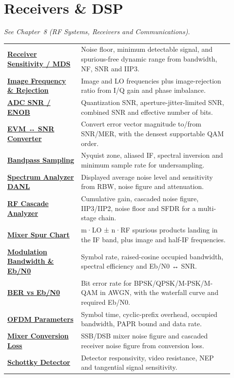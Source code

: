 \section*{Receivers \& DSP}
\noindent\emph{See Chapter~8 (RF Systems, Receivers and Communications).}
\begin{longtable}{>{\raggedright\arraybackslash}p{0.30\linewidth}>{\raggedright\arraybackslash}p{0.62\linewidth}}
\hline
\href{https://rftoolbox.ca/Sensitivity.html}{\textbf{Receiver Sensitivity / MDS}} & Noise floor, minimum detectable signal, and spurious-free dynamic range from bandwidth, NF, SNR and IIP3. \\
\href{https://rftoolbox.ca/ImageReject.html}{\textbf{Image Frequency \& Rejection}} & Image and LO frequencies plus image-rejection ratio from I/Q gain and phase imbalance. \\
\href{https://rftoolbox.ca/ADCNoise.html}{\textbf{ADC SNR / ENOB}} & Quantization SNR, aperture-jitter-limited SNR, combined SNR and effective number of bits. \\
\href{https://rftoolbox.ca/EVMSNR.html}{\textbf{EVM ↔ SNR Converter}} & Convert error vector magnitude to/from SNR/MER, with the densest supportable QAM order. \\
\href{https://rftoolbox.ca/BandpassSampling.html}{\textbf{Bandpass Sampling}} & Nyquist zone, aliased IF, spectral inversion and minimum sample rate for undersampling. \\
\href{https://rftoolbox.ca/SpectrumDANL.html}{\textbf{Spectrum Analyzer DANL}} & Displayed average noise level and sensitivity from RBW, noise figure and attenuation. \\
\href{https://rftoolbox.ca/RFCascadeAnalyzer.html}{\textbf{RF Cascade Analyzer}} & Cumulative gain, cascaded noise figure, IIP3/IIP2, noise floor and SFDR for a multi-stage chain. \\
\href{https://rftoolbox.ca/MixerSpurChart.html}{\textbf{Mixer Spur Chart}} & m·LO ± n·RF spurious products landing in the IF band, plus image and half-IF frequencies. \\
\href{https://rftoolbox.ca/ModulationBandwidth.html}{\textbf{Modulation Bandwidth \& Eb/N0}} & Symbol rate, raised-cosine occupied bandwidth, spectral efficiency and Eb/N0 ↔ SNR. \\
\href{https://rftoolbox.ca/BERvsEbN0.html}{\textbf{BER vs Eb/N0}} & Bit error rate for BPSK/QPSK/M-PSK/M-QAM in AWGN, with the waterfall curve and required Eb/N0. \\
\href{https://rftoolbox.ca/OFDMParameters.html}{\textbf{OFDM Parameters}} & Symbol time, cyclic-prefix overhead, occupied bandwidth, PAPR bound and data rate. \\
\href{https://rftoolbox.ca/MixerConversionLoss.html}{\textbf{Mixer Conversion Loss}} & SSB/DSB mixer noise figure and cascaded receiver noise figure from conversion loss. \\
\href{https://rftoolbox.ca/SchottkyDetector.html}{\textbf{Schottky Detector}} & Detector responsivity, video resistance, NEP and tangential signal sensitivity. \\
\hline
\end{longtable}

